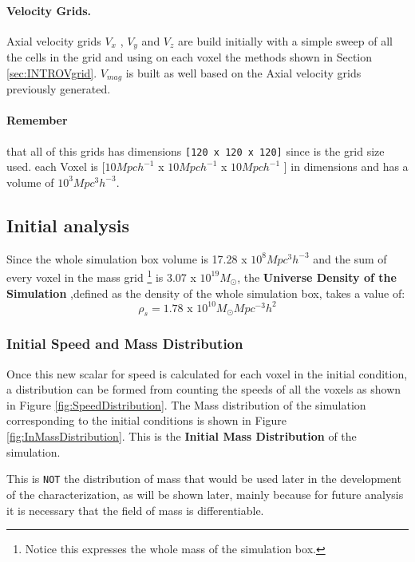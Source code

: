 \paragraph{Velocity Grids.} Axial velocity grids \textbf{$V_{x}$} , \textbf{$V_{y}$} and \textbf{$V_{z}$} are build initially with a simple sweep of all the cells in the grid and using on each voxel the methods shown in Section \ref{sec:INTROVgrid}. \textbf{$V_{mag}$} is built as well based on the Axial velocity grids previously generated.  



\paragraph{Remember} that all of this grids has dimensions \texttt{[120 x 120 x 120]} since is the grid size used. each Voxel is [$10 Mpc h^{-1}$ x $10 Mpc h^{-1}$ x $10 Mpc h^{-1}$ ] in dimensions and has a volume of $10^3 Mpc^{3}h^{-3}$.

\subsection{Initial analysis}
\label{sec:initanalysis}
Since the whole simulation box volume is 17.28 x $10^{8} Mpc^{3}h^{-3}$ and the sum of every voxel in the mass grid \footnote{Notice this expresses the whole mass of the simulation box.} is 3.07 x $10^{19} M_{\odot}$, the \textbf{Universe Density of the Simulation} ,defined as the density of the whole simulation box, takes a value of:
\begin{equation}
    \rho_{s} = 1.78\text{ x }10^{10} M_{\odot} Mpc^{-3} h^{2}
\label{eq:UNI}
\end{equation}
\subsubsection{Initial Speed and Mass Distribution}


Once this new scalar for speed is calculated for each voxel in the initial condition, a distribution can be formed from counting the  speeds of all the voxels as shown in Figure \ref{fig:SpeedDistribution}. The Mass distribution of the simulation corresponding to the initial conditions is shown in Figure \ref{fig:InMassDistribution}. This is the \textbf{Initial Mass Distribution} of the simulation. 

This is \texttt{NOT} the distribution of mass that would be used later in the development of the characterization, as will be shown later, mainly because for future analysis it is necessary that the field of mass is differentiable.


